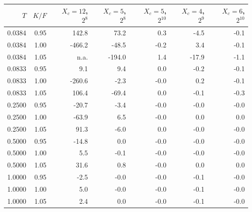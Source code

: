 \begin{tabular}{rrrrrrr}
\toprule
$T$ & $K/F$ & $X_c=12$, $2^{8}$ & $X_c=5$, $2^{8}$ & $X_c=5$, $2^{10}$ & $X_c=4$, $2^{9}$ & $X_c=6$, $2^{10}$\\
\midrule
0.0384 & 0.95 & 142.8 & 73.2 & 0.3 & -4.5 & -0.1\\
0.0384 & 1.00 & -466.2 & -48.5 & -0.2 & 3.4 & -0.1\\
0.0384 & 1.05 & n.a. & -194.0 & 1.4 & -17.9 & -1.1\\
0.0833 & 0.95 & 9.1 & 9.4 & 0.0 & -0.2 & -0.1\\
0.0833 & 1.00 & -260.6 & -2.3 & -0.0 & 0.2 & -0.1\\
0.0833 & 1.05 & 106.4 & -69.4 & 0.0 & -0.1 & -0.3\\
0.2500 & 0.95 & -20.7 & -3.4 & -0.0 & -0.0 & -0.0\\
0.2500 & 1.00 & -63.9 & 6.5 & -0.0 & 0.0 & 0.0\\
0.2500 & 1.05 & 91.3 & -6.0 & 0.0 & -0.0 & -0.0\\
0.5000 & 0.95 & -14.8 & 0.0 & -0.0 & -0.0 & -0.0\\
0.5000 & 1.00 & 5.5 & -0.1 & -0.0 & -0.0 & -0.0\\
0.5000 & 1.05 & 31.6 & 0.8 & -0.0 & 0.0 & 0.0\\
1.0000 & 0.95 & -2.5 & -0.0 & -0.0 & -0.1 & -0.0\\
1.0000 & 1.00 & 5.0 & -0.0 & -0.0 & -0.1 & -0.0\\
1.0000 & 1.05 & 2.4 & 0.0 & -0.0 & -0.1 & -0.0\\
\bottomrule
\end{tabular}

